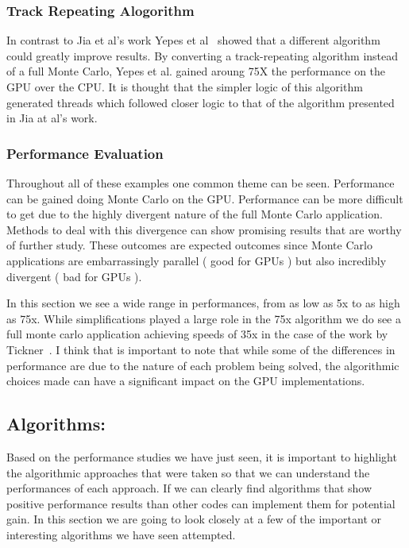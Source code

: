 \subsubsection*{\textbf{Track Repeating Alogorithm}}
In contrast to Jia et al's work Yepes et al~\cite{yepes2010gpu} showed that a different algorithm could greatly improve results.
%
By converting a track-repeating algorithm instead of a full Monte Carlo, Yepes et al. gained aroung 75X the performance on the GPU over the CPU.
%
It is thought that the simpler logic of this algorithm generated threads which followed closer logic to that of the algorithm presented in Jia at al's work.

\subsubsection*{\textbf{Performance Evaluation}}
Throughout all of these examples one common theme can be seen.
%
Performance can be gained doing Monte Carlo on the GPU.
%
Performance can be more difficult to get due to the highly divergent nature of the full Monte Carlo application.
%
Methods to deal with this divergence can show promising results that are worthy of further study.
%
These outcomes are expected outcomes since Monte Carlo applications are embarrassingly parallel ( good for GPUs ) but also incredibly divergent ( bad for GPUs ).
%

In this section we see a wide range in performances, from as low as 5x to as high as 75x.
%
While simplifications played a large role in the 75x algorithm we do see a full monte carlo application achieving speeds of 35x in the case of the work by Tickner~\cite{tickner2010monte}.
%
I think that is important to note that while some of the differences in performance are due to the nature of each problem being solved, the algorithmic choices made can have a significant impact on the GPU implementations.
%

\subsection*{Algorithms:}

Based on the performance studies we have just seen, it is important to highlight the algorithmic approaches that were taken so that we can understand the performances of each approach.
%
If we can clearly find algorithms that show positive performance results than other codes can implement them for potential gain.
%
In this section we are going to look closely at a few of the important or interesting algorithms we have seen attempted.
%

